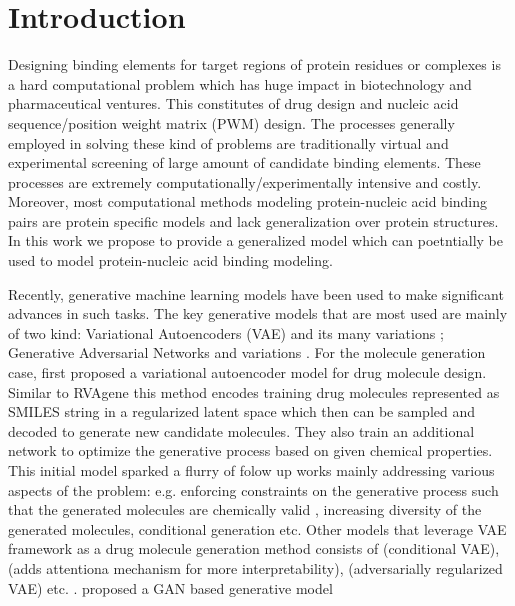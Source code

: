 \section{Introduction} 

Designing binding elements for target regions of protein residues or complexes is a hard
computational problem  which has huge impact in biotechnology and pharmaceutical ventures.
This constitutes of drug design and nucleic acid sequence/position weight matrix (PWM)
design. The processes generally employed in solving these kind of problems are traditionally virtual and
experimental screening of large amount of candidate binding elements. These processes are extremely
computationally/experimentally intensive and costly. Moreover, 
most computational methods modeling protein-nucleic acid binding pairs are protein specific models
and lack generalization over protein structures. In this work we propose to provide a generalized
model which can poetntially be used to model protein-nucleic acid binding modeling.
\par
Recently, generative machine learning models have
been used to make significant advances in such tasks. The key generative models that are most
used are mainly of two kind: Variational Autoencoders (VAE) \citep{Kingma2014} and its many
variations \citep{higgins2016beta, sohn2015learning,dilokthanakul2016deep}; Generative Adversarial
Networks \citep{goodfellow2014generative} and variations \citep{wang2018high,zhu2017unpaired}.
For the molecule generation case, \citet{gomez2018automatic} first proposed a variational autoencoder model for drug molecule design.
Similar to RVAgene \citep{mitra2020rvagene} this method encodes training drug molecules represented as SMILES
\citep{weininger1988smiles} string in a regularized latent space which then can be sampled and
decoded to generate new candidate molecules. They also train an additional network to optimize the
generative process based on given chemical properties. This initial model sparked a flurry of folow up 
works mainly addressing various aspects of the problem: e.g. enforcing constraints on the generative process 
such that the generated molecules are chemically valid \citet{kusner2017grammar}, increasing diversity of the generated
molecules, conditional generation etc.  Other models that leverage VAE framework as a drug molecule
generation method consists of \citet{lim2018molecular} (conditional VAE), \citet{dollar2021giving}
(adds attentiona mechanism for more interpretability), \citet{hong2019molecular} (adversarially
regularized VAE) etc. . \citet{kadurin2017drugan} proposed a GAN based generative model
